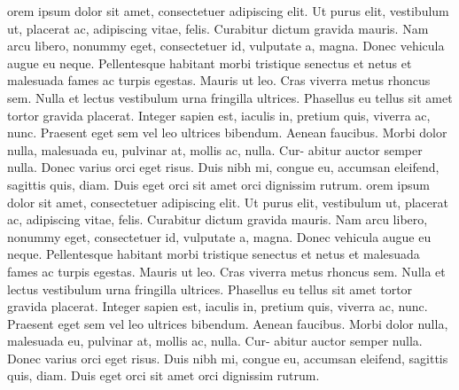 {{{            orem ipsum dolor sit amet, consectetuer adipiscing elit. Ut purus elit,
vestibulum ut, placerat ac, adipiscing vitae, felis. Curabitur dictum gravida
mauris. Nam arcu libero, nonummy eget, consectetuer id, vulputate a, magna.
Donec vehicula augue eu neque. Pellentesque habitant morbi tristique senectus
et netus et malesuada fames ac turpis egestas. Mauris ut leo. Cras viverra
metus rhoncus sem. Nulla et lectus vestibulum urna fringilla ultrices. Phasellus
eu tellus sit amet tortor gravida placerat. Integer sapien est, iaculis in, pretium
quis, viverra ac, nunc. Praesent eget sem vel leo ultrices bibendum. Aenean
faucibus. Morbi dolor nulla, malesuada eu, pulvinar at, mollis ac, nulla. Cur-
abitur auctor semper nulla. Donec varius orci eget risus. Duis nibh mi, congue
eu, accumsan eleifend, sagittis quis, diam. Duis eget orci sit amet orci dignissim
rutrum.
orem ipsum dolor sit amet, consectetuer adipiscing elit. Ut purus elit,
vestibulum ut, placerat ac, adipiscing vitae, felis. Curabitur dictum gravida
mauris. Nam arcu libero, nonummy eget, consectetuer id, vulputate a, magna.
Donec vehicula augue eu neque. Pellentesque habitant morbi tristique senectus
et netus et malesuada fames ac turpis egestas. Mauris ut leo. Cras viverra
metus rhoncus sem. Nulla et lectus vestibulum urna fringilla ultrices. Phasellus
eu tellus sit amet tortor gravida placerat. Integer sapien est, iaculis in, pretium
quis, viverra ac, nunc. Praesent eget sem vel leo ultrices bibendum. Aenean
faucibus. Morbi dolor nulla, malesuada eu, pulvinar at, mollis ac, nulla. Cur-
abitur auctor semper nulla. Donec varius orci eget risus. Duis nibh mi, congue
eu, accumsan eleifend, sagittis quis, diam. Duis eget orci sit amet orci dignissim
rutrum.
        }
    }
}






